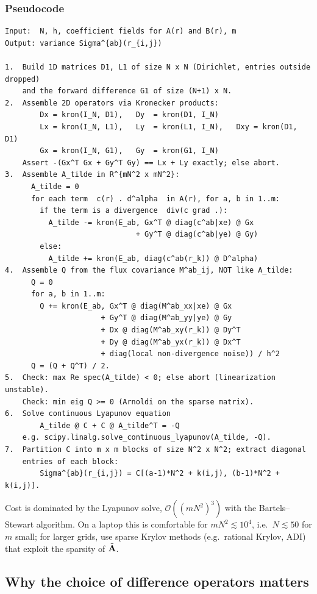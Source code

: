\documentclass[a5paper]{article}
\begin{document}
\subsubsection{Pseudocode}
\begin{verbatim}
Input:  N, h, coefficient fields for A(r) and B(r), m
Output: variance Sigma^{ab}(r_{i,j})

1.  Build 1D matrices D1, L1 of size N x N (Dirichlet, entries outside dropped)
    and the forward difference G1 of size (N+1) x N.
2.  Assemble 2D operators via Kronecker products:
        Dx = kron(I_N, D1),   Dy  = kron(D1, I_N)
        Lx = kron(I_N, L1),   Ly  = kron(L1, I_N),   Dxy = kron(D1, D1)
        Gx = kron(I_N, G1),   Gy  = kron(G1, I_N)
    Assert -(Gx^T Gx + Gy^T Gy) == Lx + Ly exactly; else abort.
3.  Assemble A_tilde in R^{mN^2 x mN^2}:
      A_tilde = 0
      for each term  c(r) . d^alpha  in A(r), for a, b in 1..m:
        if the term is a divergence  div(c grad .):
          A_tilde -= kron(E_ab, Gx^T @ diag(c^ab|xe) @ Gx
                              + Gy^T @ diag(c^ab|ye) @ Gy)
        else:
          A_tilde += kron(E_ab, diag(c^ab(r_k)) @ D^alpha)
4.  Assemble Q from the flux covariance M^ab_ij, NOT like A_tilde:
      Q = 0
      for a, b in 1..m:
        Q += kron(E_ab, Gx^T @ diag(M^ab_xx|xe) @ Gx
                      + Gy^T @ diag(M^ab_yy|ye) @ Gy
                      + Dx @ diag(M^ab_xy(r_k)) @ Dy^T
                      + Dy @ diag(M^ab_yx(r_k)) @ Dx^T
                      + diag(local non-divergence noise)) / h^2
      Q = (Q + Q^T) / 2.
5.  Check: max Re spec(A_tilde) < 0; else abort (linearization unstable).
    Check: min eig Q >= 0 (Arnoldi on the sparse matrix).
6.  Solve continuous Lyapunov equation
        A_tilde @ C + C @ A_tilde^T = -Q
    e.g. scipy.linalg.solve_continuous_lyapunov(A_tilde, -Q).
7.  Partition C into m x m blocks of size N^2 x N^2; extract diagonal
    entries of each block:
        Sigma^{ab}(r_{i,j}) = C[(a-1)*N^2 + k(i,j), (b-1)*N^2 + k(i,j)].
\end{verbatim}
Cost is dominated by the Lyapunov solve, $\mathcal{O}((mN^2)^3)$ with the Bartels--Stewart algorithm. On a laptop this is comfortable for $mN^2 \lesssim 10^4$, i.e.\ $N\lesssim 50$ for $m$ small; for larger grids, use sparse Krylov methods (e.g.\ rational Krylov, ADI) that exploit the sparsity of $\tilde{\mathbf{A}}$.

\subsection{Why the choice of difference operators matters}
\label{sec-stencil-choice}
\end{document}
